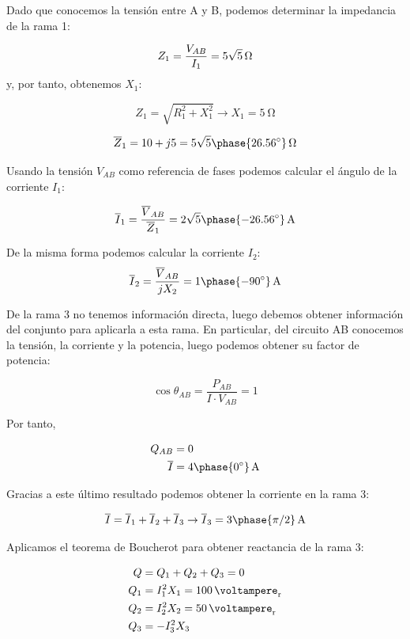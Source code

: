 \documentclass[12pt]{article}
\begin{document}
Dado que conocemos la tensión entre A y B, podemos determinar la impedancia de la rama 1:

\[
  Z_1 = \frac{V_{AB}}{I_1} = \SI[parse-numbers=false]{5\sqrt{5}}{\ohm}
\]
y, por tanto, obtenemos $X_1$:

\[
  Z_1 = \sqrt{R_1^2 + X_1^2} \rightarrow X_1 = \SI{5}{\ohm}
\]

\[
  \overline{Z}_1 = 10 + j5 = \SI[parse-numbers=false]{5\sqrt{5}\phase{\ang{26.56}}}{\ohm} 
\]

Usando la tensión $V_{AB}$ como referencia de fases podemos calcular el ángulo de la corriente $I_1$:

\[
  \overline{I}_1 = \frac{\overline{V}_{AB}}{\overline{Z}_1} = \SI[parse-numbers=false]{2\sqrt{5}\phase{\ang{-26.56}}}{\ampere} 
\]

De la misma forma podemos calcular la corriente $I_2$:
\[
  \overline{I}_2 = \frac{\overline{V}_{AB}}{jX_2} = \SI[parse-numbers=false]{1\phase{\ang{-90}}}{\ampere} 
\]

De la rama 3 no tenemos información directa, luego debemos obtener información del conjunto para aplicarla a esta rama. En particular, del circuito AB conocemos la tensión, la corriente y la potencia, luego podemos obtener su factor de potencia:

\[
  \cos\theta_{AB} = \frac{P_{AB}}{I \cdot V_{AB}} = 1
\]

Por tanto,

\begin{align*}
  Q_{AB} &= 0\\
  \overline{I} &= \SI[parse-numbers=false]{4\phase{\ang{0}}}{\ampere} 
\end{align*}
  
Gracias a este último resultado podemos obtener la corriente en la rama 3:

\[
  \overline{I} = \overline{I}_1 + \overline{I}_2 + \overline{I}_3 \rightarrow \overline{I}_3 = \SI[parse-numbers=false]{3\phase{\pi/2}}{\ampere}
\]

Aplicamos el teorema de Boucherot para obtener reactancia de la rama 3:

\begin{align*}
  Q &= Q_1 + Q_2 + Q_3 = 0\\
  Q_1 &= I_1^2 X_1 = \SI{100}{\voltampere_r}\\
  Q_2 &= I_2^2 X_2 = \SI{50}{\voltampere_r}\\
  Q_3 &= - I_3^2 X_3
\end{align*}
\end{document}

